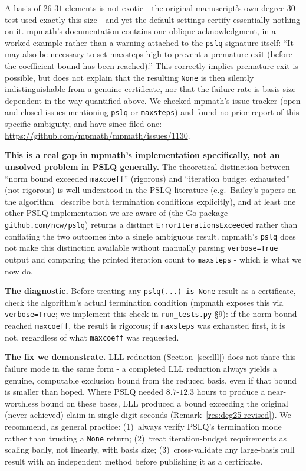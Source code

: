 \documentclass[12pt]{article}
\theoremstyle{definition}
\theoremstyle{remark}
\begin{document}
A basis of $26$-$31$ elements is not exotic - the original
manuscript's own degree-30 test used exactly this size - and yet the
default settings certify essentially nothing on it.  mpmath's
documentation contains one oblique acknowledgment, in a worked example
rather than a warning attached to the \texttt{pslq} signature itself:
``It may also be necessary to set maxsteps high to prevent a premature
exit (before the coefficient bound has been reached).''  This
correctly implies premature exit is possible, but does not explain
that the resulting \texttt{None} is then silently indistinguishable
from a genuine certificate, nor that the failure rate is
basis-size-dependent in the way quantified above.  We checked
mpmath's issue tracker (open and closed issues mentioning
\texttt{pslq} or \texttt{maxsteps}) and found no prior report of this
specific ambiguity, and have since filed one:
\url{https://github.com/mpmath/mpmath/issues/1130}.

\textbf{This is a real gap in mpmath's implementation specifically,
not an unsolved problem in PSLQ generally.}  The theoretical
distinction between ``norm bound exceeded \texttt{maxcoeff}''
(rigorous) and ``iteration budget exhausted'' (not rigorous) is well
understood in the PSLQ literature (e.g.\ Bailey's papers on the
algorithm~\cite{FergusonBaileyArwade1999} describe both termination
conditions explicitly), and at
least one other PSLQ implementation we are aware of (the Go package
\texttt{github.com/ncw/pslq}) returns a distinct
\texttt{ErrorIterationsExceeded} rather than conflating the two
outcomes into a single ambiguous result.  mpmath's \texttt{pslq} does
not make this distinction available without manually parsing
\texttt{verbose=True} output and comparing the printed iteration count
to \texttt{maxsteps} - which is what we now do.

\textbf{The diagnostic.}  Before treating any
\texttt{pslq(...) is None} result as a certificate, check the
algorithm's actual termination condition (mpmath exposes this via
\texttt{verbose=True}; we implement this check in
\texttt{run\_tests.py} \S9): if the norm bound reached
\texttt{maxcoeff}, the result is rigorous; if \texttt{maxsteps} was
exhausted first, it is not, regardless of what \texttt{maxcoeff} was
requested.

\textbf{The fix we demonstrate.}  LLL reduction
(Section~\ref{sec:lll}) does not share this failure mode in the same
form - a completed LLL reduction always yields a genuine, computable
exclusion bound from the reduced basis, even if that bound is smaller
than hoped.  Where PSLQ needed $8.7$-$12.3$ hours to produce a
near-worthless bound on these bases, LLL produced a bound exceeding
the original (never-achieved) claim in single-digit seconds
(Remark~\ref{res:deg25-revised}).  We recommend, as general practice:
(1)~always verify PSLQ's termination mode rather than trusting a
\texttt{None} return; (2)~treat iteration-budget requirements as
scaling badly, not linearly, with basis size; (3)~cross-validate any
large-basis null result with an independent method before publishing
it as a certificate.
\end{document}
